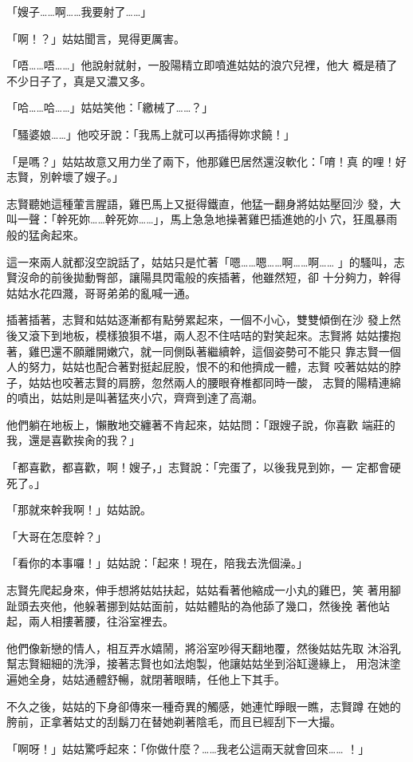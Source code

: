 「嫂子……啊……我要射了……」

「啊！？」姑姑聞言，晃得更厲害。

「唔……唔……」他說射就射，一股陽精立即噴進姑姑的浪穴兒裡，他大
概是積了不少日子了，真是又濃又多。

「哈……哈……」姑姑笑他：「繳械了……？」

「騷婆娘……」他咬牙說：「我馬上就可以再插得妳求饒！」

「是嗎？」姑姑故意又用力坐了兩下，他那雞巴居然還沒軟化：「唷！真
的哩！好志賢，別幹壞了嫂子。」

志賢聽她這種葷言腥語，雞巴馬上又挺得鐵直，他猛一翻身將姑姑壓回沙
發，大叫一聲：「幹死妳……幹死妳……」，馬上急急地操著雞巴插進她的小
穴，狂風暴雨般的猛肏起來。

這一來兩人就都沒空說話了，姑姑只是忙著「嗯……嗯……啊……啊……
」的騷叫，志賢沒命的前後拋動臀部，讓陽具閃電般的疾插著，他雖然短，卻
十分夠力，幹得姑姑水花四濺，哥哥弟弟的亂喊一通。

插著插著，志賢和姑姑逐漸都有點勞累起來，一個不小心，雙雙傾倒在沙
發上然後又滾下到地板，模樣狼狽不堪，兩人忍不住咭咭的對笑起來。志賢將
姑姑摟抱著，雞巴還不願離開嫩穴，就一同側臥著繼續幹，這個姿勢可不能只
靠志賢一個人的努力，姑姑也配合著對挺起屁股，恨不的和他擠成一體，志賢
咬著姑姑的脖子，姑姑也咬著志賢的肩膀，忽然兩人的腰眼脊椎都同時一酸，
志賢的陽精連綿的噴出，姑姑則是叫著猛夾小穴，齊齊到達了高潮。

他們躺在地板上，懶散地交纏著不肯起來，姑姑問：「跟嫂子說，你喜歡
端莊的我，還是喜歡挨肏的我？」

「都喜歡，都喜歡，啊！嫂子，」志賢說：「完蛋了，以後我見到妳，一
定都會硬死了。」

「那就來幹我啊！」姑姑說。

「大哥在怎麼幹？」

「看你的本事囉！」姑姑說：「起來！現在，陪我去洗個澡。」

志賢先爬起身來，伸手想將姑姑扶起，姑姑看著他縮成一小丸的雞巴，笑
著用腳趾頭去夾他，他躲著挪到姑姑面前，姑姑體貼的為他舔了幾口，然後挽
著他站起，兩人相摟著腰，往浴室裡去。

他們像新戀的情人，相互弄水嬉鬧，將浴室吵得天翻地覆，然後姑姑先取
沐浴乳幫志賢細細的洗淨，接著志賢也如法炮製，他讓姑姑坐到浴缸邊緣上，
用泡沫塗遍她全身，姑姑通體舒暢，就閉著眼睛，任他上下其手。

不久之後，姑姑的下身卻傳來一種奇異的觸感，她連忙睜眼一瞧，志賢蹲
在她的胯前，正拿著姑丈的刮鬍刀在替她剃著陰毛，而且已經刮下一大撮。

「啊呀！」姑姑驚呼起來：「你做什麼？……我老公這兩天就會回來……
！」

